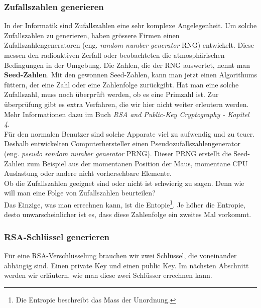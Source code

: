 \subsubsection{Zufallszahlen generieren}
In der Informatik sind Zufallszahlen eine sehr komplexe Angelegenheit. Um solche Zufallszahlen zu generieren, haben grössere Firmen einen Zufallszahlengeneratoren (eng. \textit{random number generator} RNG) entwickelt. Diese messen den radioaktiven Zerfall oder beobachteten die atmosphärischen Bedingungen in der Umgebung. Die Zahlen, die der RNG auswertet, nennt man \textbf{Seed-Zahlen}. Mit den gewonnen Seed-Zahlen, kann man jetzt einen Algorithums füttern, der eine Zahl oder eine Zahlenfolge zurückgibt. Hat man eine solche Zufallszahl, muss noch überprüft werden, ob es eine Primzahl ist. Zur überprüfung gibt es extra Verfahren, die wir hier nicht weiter erleutern werden. Mehr Informationen dazu im Buch \textit{RSA and Public-Key Cryptography - Kapitel 4}.\\
%
Für den normalen Benutzer sind solche Apparate viel zu aufwendig und zu teuer. Deshalb entwickelten Computerhersteller einen Pseudozufallszahlengenerator (eng. \textit{pseudo random number generator} PRNG). Dieser PRNG erstellt die Seed-Zahlen zum Beispiel aus der momentanen Position der Maus, momentane CPU Auslastung oder andere nicht vorhersehbare Elemente.\\
Ob die Zufallszahlen geeignet sind oder nicht ist schwierig zu sagen. Denn wie will man eine Folge von Zufallszahlen beurteilen?\\
Das Einzige, was man errechnen kann, ist die Entopie\footnote{Die Entropie beschreibt das Mass der Unordnung.}. Je höher die Entropie, desto unwarscheinlicher ist es, dass diese Zahlenfolge ein zweites Mal vorkommt.
\subsubsection{RSA-Schlüssel generieren}
Für eine RSA-Verschlüsselung brauchen wir zwei Schlüssel, die voneinander abhängig sind. Einen private Key und einen public Key. Im nächsten Abschnitt werden wir erläutern, wie man diese zwei Schlüsser errechnen kann.
%
